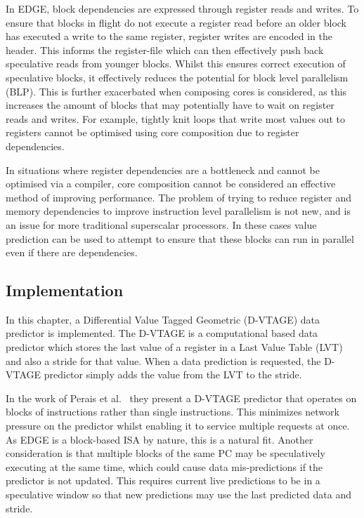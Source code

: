 In EDGE, block dependencies are expressed through register reads and writes.
To ensure that blocks in flight do not execute a register read before an older block has executed a write to the same register, register writes are encoded in the header.
This informs the register-file which can then effectively push back speculative reads from younger blocks.
Whilst this ensures correct execution of speculative blocks, it effectively reduces the potential for block level parallelism (BLP).
This is further exacerbated when composing cores is considered, as this increases the amount of blocks that may potentially have to wait on register reads and writes.
For example, tightly knit loops that write most values out to registers cannot be optimised using core composition due to register dependencies.

In situations where register dependencies are a bottleneck and cannot be optimised via a compiler, core composition cannot be considered an effective method of improving performance.
The problem of trying to reduce register and memory dependencies to improve instruction level parallelism is not new, and is an issue for more traditional superscalar processors.
In these cases value prediction can be used to attempt to ensure that these blocks can run in parallel even if there are dependencies.

\subsection{Implementation}
In this chapter, a Differential Value Tagged Geometric (D-VTAGE) data predictor is implemented.
The D-VTAGE is a computational based data predictor which stores the last value of a register in a Last Value Table (LVT) and also a stride for that value.
When a data prediction is requested, the D-VTAGE predictor simply adds the value from the LVT to the stride.

In the work of Perais et al.~\cite{peraisBeBop2015} they present a D-VTAGE predictor that operates on blocks of instructions rather than single instructions.
This minimizes network pressure on the predictor whilst enabling it to service multiple requests at once.
As EDGE is a block-based ISA by nature, this is a natural fit.
Another consideration is that multiple blocks of the same PC may be speculatively executing at the same time, which could cause data mis-predictions if the predictor is not updated.
This requires current live predictions to be in a speculative window so that new predictions may use the last predicted data and stride.

